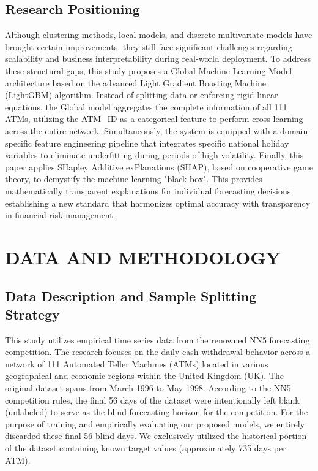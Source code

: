 \documentclass[conference, 12pt, onecolumn]{IEEEtran}
\begin{document}
\subsection{Research Positioning}
Although clustering methods, local models, and discrete multivariate models have brought certain improvements, they still face significant challenges regarding scalability and business interpretability during real-world deployment. To address these structural gaps, this study proposes a Global Machine Learning Model architecture based on the advanced Light Gradient Boosting Machine (LightGBM) algorithm. Instead of splitting data or enforcing rigid linear equations, the Global model aggregates the complete information of all 111 ATMs, utilizing the ATM\_ID as a categorical feature to perform cross-learning across the entire network. Simultaneously, the system is equipped with a domain-specific feature engineering pipeline that integrates specific national holiday variables to eliminate underfitting during periods of high volatility. Finally, this paper applies SHapley Additive exPlanations (SHAP), based on cooperative game theory, to demystify the machine learning "black box". This provides mathematically transparent explanations for individual forecasting decisions, establishing a new standard that harmonizes optimal accuracy with transparency in financial risk management.

\section{DATA AND METHODOLOGY}

\subsection{Data Description and Sample Splitting Strategy}
This study utilizes empirical time series data from the renowned NN5 forecasting competition. The research focuses on the daily cash withdrawal behavior across a network of 111 Automated Teller Machines (ATMs) located in various geographical and economic regions within the United Kingdom (UK). The original dataset spans from March 1996 to May 1998. According to the NN5 competition rules, the final 56 days of the dataset were intentionally left blank (unlabeled) to serve as the blind forecasting horizon for the competition. For the purpose of training and empirically evaluating our proposed models, we entirely discarded these final 56 blind days. We exclusively utilized the historical portion of the dataset containing known target values (approximately 735 days per ATM). 
\end{document}
